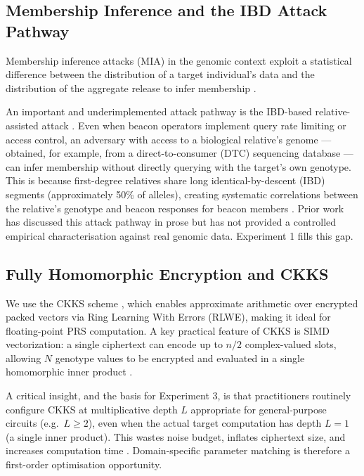 \documentclass[conference]{IEEEtran}
\begin{document}
\subsection{Membership Inference and the IBD Attack Pathway}

Membership inference attacks (MIA) in the genomic context exploit a statistical
difference between the distribution of a target individual's data and the
distribution of the aggregate release to infer membership \cite{homer2008,
shringarpure2015,vonthenen2019}.

An important and underimplemented attack pathway is the IBD-based relative-
assisted attack \cite{gymrek2013,erlich2014}. Even when beacon operators
implement query rate limiting or access control, an adversary with access to a
biological relative's genome --- obtained, for example, from a direct-to-consumer
(DTC) sequencing database --- can infer membership without directly querying
with the target's own genotype. This is because first-degree relatives share
long identical-by-descent (IBD) segments (approximately 50\% of alleles),
creating systematic correlations between the relative's genotype and beacon
responses for beacon members \cite{erlich2014,gursoy2022functional}. Prior work
has discussed this attack pathway in prose \cite{gymrek2013,erlich2014,
shringarpure2015} but has not provided a controlled empirical characterisation
against real genomic data. Experiment 1 fills this gap.

\subsection{Fully Homomorphic Encryption and CKKS}

We use the CKKS scheme \cite{cheon2017}, which enables approximate arithmetic
over encrypted packed vectors via Ring Learning With Errors (RLWE), making it
ideal for floating-point PRS computation. A key practical feature of CKKS is
SIMD vectorization: a single ciphertext can encode up to $n/2$ complex-valued
slots, allowing $N$ genotype values to be encrypted and evaluated in a single
homomorphic inner product \cite{blatt2020,gursoy2022imputation}.

A critical insight, and the basis for Experiment 3, is that practitioners
routinely configure CKKS at multiplicative depth $L$ appropriate for
general-purpose circuits (e.g.\ $L\geq2$), even when the actual target
computation has depth $L=1$ (a single inner product). This wastes noise budget,
inflates ciphertext size, and increases computation time \cite{cheon2019,
blatt2020}. Domain-specific parameter matching is therefore a first-order
optimisation opportunity.
\end{document}
